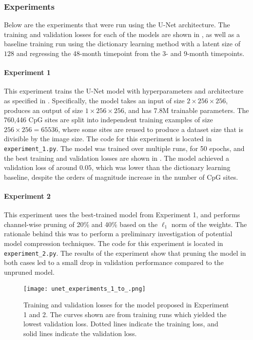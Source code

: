 \documentclass[twocolumn, 9pt]{extarticle}
\begin{document}
\subsubsection{Experiments}

Below are the experiments that were run using the U-Net architecture. The training and validation losses for each of the models are shown in , as well as a baseline training run using the dictionary learning method with a latent size of $128$ and regressing the 48-month timepoint from the 3- and 9-month timepoints.

\paragraph{Experiment 1} This experiment trains the U-Net model with hyperparameters and architecture as specified in \citet{ronneberger2015u}. Specifically, the model takes an input of size $2 \times 256 \times 256$, produces an output of size $1 \times 256 \times 256$, and has 7.8M trainable parameters. The 760,446 CpG sites are split into independent training examples of size $ 256 \times 256 = 65536$, where some sites are reused to produce a dataset size that is divisible by the image size. The code for this experiment is located in \texttt{experiment\_1.py}. The model was trained over multiple runs, for 50 epochs, and the best training and validation losses are shown in . The model achieved a validation loss of around $0.05$, which was lower than the dictionary learning baseline, despite the orders of magnitude increase in the number of CpG sites.

\paragraph{Experiment 2} This experiment uses the best-trained model from Experiment 1, and performs channel-wise pruning of 20\% and 40\% based on the $\ell_{1}$ norm of the weights. The rationale behind this was to perform a preliminary investigation of potential model compression techniques. The code for this experiment is located in \texttt{experiment\_2.py}. The results of the experiment show that pruning the model in both cases led to a small drop in validation performance compared to the unpruned model.

\begin{figure}
  \centering
  \texttt{[image: unet\_experiments\_1\_to\_.png]}
  \caption{Training and validation losses for the model proposed in Experiment 1 and 2. The curves shown are from training runs which yielded the lowest validation loss. Dotted lines indicate the training loss, and solid lines indicate the validation loss.}
  \label{fig:losses_unet}
\end{figure}
\end{document}
